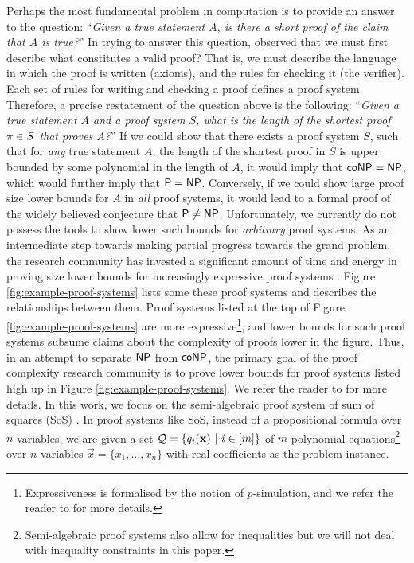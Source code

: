 \documentclass[11pt]{article}
\begin{document}
Perhaps the most fundamental problem in computation is to provide an answer to the question: ``\textit{Given a true statement $A$, is there a short proof of the claim that $A$ is true?}''
In trying to answer this question, \citet{cook1979relative} observed that we must first describe what constitutes a valid proof?
That is, we must describe the language in which the proof is written (axioms), and the rules for checking it (the verifier).
Each set of rules for writing and checking a proof defines a proof system.
Therefore, a precise restatement of the question above is the following:  ``\textit{Given a true statement $A$ and a proof system $S$, what is the length of the shortest proof $\pi \in S$ that proves $A$?}''
If we could show that there exists a proof system $S$, such that for \emph{any} true statement $A$, the length of the shortest proof in $S$ is upper bounded by some polynomial in the length of $A$, it would imply that $\mathsf{coNP} = \mathsf{NP}$, which would further imply that $\mathsf{P} = \mathsf{NP}$.
Conversely, if we could show large proof size lower bounds for $A$ in \emph{all} proof systems, it would lead to a formal proof of the widely believed conjecture that $\mathsf{P} \neq \mathsf{NP}$.
Unfortunately, we currently do not possess the tools to show lower such bounds for \emph{arbitrary} proof systems.
As an intermediate step towards making partial progress towards the grand problem, the research community has invested a significant amount of time and energy in proving size lower bounds for increasingly expressive proof systems \citep{blake1937canonical,razborov1998lower, impagliazzo1999lower, alekhnovich2001lower, buss1999linear}.
 Figure \ref{fig:example-proof-systems} lists some these proof systems and describes the relationships between them.
 Proof systems listed at the top of Figure \ref{fig:example-proof-systems} are more expressive\footnote{Expressiveness is formalised by the notion of $p$-simulation, and we refer the reader to \citep[Definition 1.6]{ProofComplexityLecNotes} for more details.}, and lower bounds for such proof systems subsume claims about the complexity of proofs lower in the figure.
Thus, in an attempt to separate $\mathsf{NP}$ from $\mathsf{coNP}$, the primary goal of the proof complexity research community is to prove lower bounds for proof systems listed high up in Figure \ref{fig:example-proof-systems}.
We refer the reader to \citep{krajicek2019proof, ProofComplexityLecNotesPaul} for more details.
In this work, we focus on the semi-algebraic proof system of sum of squares (SoS) \citep{parrilo2000structured, boazCourse}.
In proof systems like SoS, instead of a propositional formula over $n$ variables, we are given a set $\mathcal{Q} =\{q_i(\mathbf{x}) \text{ } |\text{ } i \in [m] \}$ of $m$ polynomial equations\footnote{Semi-algebraic proof systems also allow for inequalities but we will not deal with inequality constraints in this paper.} over $n$ variables $\vec{x} = \{x_1, \dots, x_n\}$ with real coefficients as the problem instance.
\end{document}

